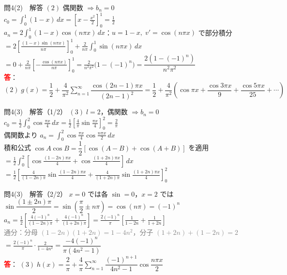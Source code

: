 \documentclass[professionalfonts]{beamer}
\begin{document}
\begin{frame}{問4(2)　解答}
  $(2)$ 偶関数 $\Rightarrow b_{n}=0$\\[4pt]
  $\displaystyle c_{0}=\int_{0}^{1}(1-x)\,dx=\left[x-\frac{x^{2}}{2}\right]_{0}^{1}=\frac{1}{2}$\\[4pt]
  $\displaystyle a_{n}=2\int_{0}^{1}(1-x)\cos(n\pi x)\,dx$：$u=1-x,\;v'=\cos(n\pi x)$ で部分積分\\[4pt]
  $\displaystyle =2\left[\frac{(1-x)\sin(n\pi x)}{n\pi}\right]_{0}^{1}+\frac{2}{n\pi}\int_{0}^{1}\sin(n\pi x)\,dx$\\[4pt]
  $\displaystyle =0+\frac{2}{n\pi}\left[-\frac{\cos(n\pi x)}{n\pi}\right]_{0}^{1}
  =\frac{2}{n^{2}\pi^{2}}\bigl(1-(-1)^{n}\bigr)=\dfrac{2(1-(-1)^{n})}{n^{2}\pi^{2}}$\\[8pt]
  \textcolor{red}{\textbf{答}}：
  $(2)\; g(x) = \dfrac{1}{2} + \dfrac{4}{\pi^{2}}\displaystyle\sum_{n=1}^{\infty} \dfrac{\cos(2n-1)\pi x}{(2n-1)^{2}} = \dfrac{1}{2} + \dfrac{4}{\pi^{2}}\!\left(\cos \pi x + \dfrac{\cos 3\pi x}{9} + \dfrac{\cos 5\pi x}{25} + \cdots\right)$
\end{frame}

\begin{frame}{問4(3)　解答（1/2）}
  $(3)\; l=2$，偶関数 $\Rightarrow b_{n}=0$\\[4pt]
  $\displaystyle c_{0}=\frac{1}{2}\int_{0}^{2}\cos\frac{\pi x}{4}\,dx
  =\frac{1}{2}\left[\frac{4}{\pi}\sin\frac{\pi x}{4}\right]_{0}^{2}=\frac{2}{\pi}$\\[6pt]
  偶関数より $\displaystyle a_{n}=\int_{0}^{2}\cos\frac{\pi x}{4}\cos\frac{n\pi x}{2}\,dx$\\[4pt]
  積和公式 $\cos A\cos B=\dfrac{1}{2}[\cos(A-B)+\cos(A+B)]$ を適用\\[4pt]
  $\displaystyle=\frac{1}{2}\int_{0}^{2}\!\left[\cos\frac{(1-2n)\pi x}{4}+\cos\frac{(1+2n)\pi x}{4}\right]\,dx$\\[4pt]
  $\displaystyle=\frac{1}{2}\left[\frac{4}{(1-2n)\pi}\sin\frac{(1-2n)\pi x}{4}+\frac{4}{(1+2n)\pi}\sin\frac{(1+2n)\pi x}{4}\right]_{0}^{2}$
\end{frame}

\begin{frame}{問4(3)　解答（2/2）}
  $x=0$ では各 $\sin=0$，$x=2$ では\\[4pt]
  $\sin\dfrac{(1\pm2n)\pi}{2}=\sin\!\left(\dfrac{\pi}{2}\pm n\pi\right)=\cos(n\pi)=(-1)^{n}$\\[6pt]
  $\displaystyle a_{n}=\frac{1}{2}\!\left[\frac{4(-1)^{n}}{(1-2n)\pi}+\frac{4(-1)^{n}}{(1+2n)\pi}\right]
  =\frac{2(-1)^{n}}{\pi}\!\left[\frac{1}{1-2n}+\frac{1}{1+2n}\right]$\\[4pt]
  {\footnotesize\textcolor{gray}{通分：分母 $(1-2n)(1+2n)=1-4n^{2}$，分子 $(1+2n)+(1-2n)=2$}}\\[2pt]
  $\displaystyle=\frac{2(-1)^{n}}{\pi}\cdot\frac{2}{1-4n^{2}}=\dfrac{-4(-1)^{n}}{\pi(4n^{2}-1)}$\\[8pt]
  \textcolor{red}{\textbf{答}}：
  $(3)\; h(x) = \dfrac{2}{\pi} + \dfrac{4}{\pi}\displaystyle\sum_{n=1}^\infty \dfrac{(-1)^{n+1}}{4n^{2}-1} \cos\dfrac{n\pi x}{2}$
\end{frame}
\end{document}
